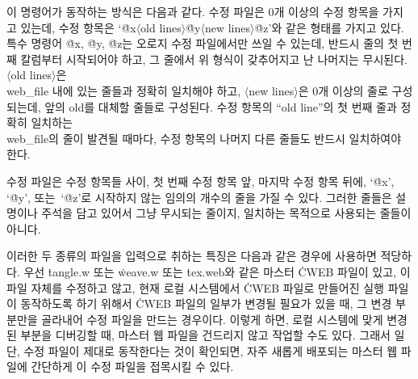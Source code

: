 \more 이 명령어가 동작하는 방식은 다음과 같다. 수정 파일은 0개 이상의 수정 항목을 가지고
있는데, 수정 항목은
`\.{@x}$\langle$old lines$\rangle$\.{@y}$\langle$new
lines$\rangle$\.{@z}'와 같은 형태를 가지고 있다. 특수 명령어 \.{@x},
\.{@y}, \.{@z}는 오로지 수정 파일에서만 쓰일 수 있는데, 반드시 줄의
첫 번째 칼럼부터 시작되어야 하고, 그 줄에서 위 형식이 갖추어지고 난 나머지는 무시된다.
$\langle$old lines$\rangle$은 \\{web\_file} 내에 있는 줄들과 정확히
일치해야 하고, $\langle$new lines$\rangle$은 0개 이상의 줄로
구성되는데, 앞의 old를 대체할 줄들로 구성된다. 수정 항목의 ``old
line''의 첫 번째 줄과 정확히 일치하는 \\{web\_file}의 줄이 발견될 때마다,
수정 항목의 나머지 다른 줄들도 반드시 일치하여야 한다.

\more 수정 파일은 수정 항목들 사이, 첫 번째 수정 항목 앞, 마지막 수정 항목 뒤에,
`\.{@x}', `\.{@y}', 또는~`\.{@z}'로 시작하지 않는 임의의
개수의 줄을 가질 수 있다. 그러한 줄들은 설명이나 주석을 담고 있어서 
그냥 무시되는 줄이지, 일치하는 목적으로 사용되는 줄들이 아니다.

\more 이러한 두 종류의 파일을 입력으로 취하는 특징은 다음과 같은
경우에 사용하면 적당하다. 우선 \.{tangle.w} 또는 \.{weave.w} 또는
\.{tex.web}와 같은 마스터 \.{CWEB} 파일이 있고, 이 파일
자체를 수정하고 않고, 현재 로컬 시스템에서 \.{CWEB} 파일로 만들어진
실행 파일이 동작하도록 하기 위해서 \.{CWEB} 파일의 일부가 변경될
필요가 있을 때, 그 변경 부분만을 골라내어 수정 파일을 만드는 경우이다.
이렇게 하면, 로컬 시스템에 맞게 변경된 부분을 디버깅할 때, 마스터
웹 파일을 건드리지 않고 작업할 수도 있다. 그래서 일단, 수정 파일이
제대로 동작한다는 것이 확인되면, 자주 새롭게 배포되는 마스터 웹 파일에
간단하게 이 수정 파일을 접목시킬 수 있다.

